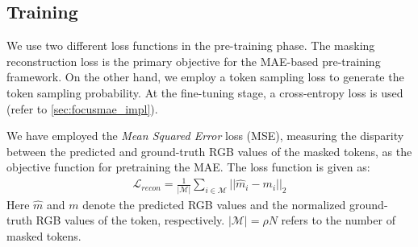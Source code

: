 \subsection{Training}
%
We use two different loss functions in the \focusmae pre-training phase. The masking reconstruction loss is the primary objective for the MAE-based pre-training framework. On the other hand, we employ a token sampling loss to generate the token sampling probability. At the fine-tuning stage, a cross-entropy loss is used (refer to \cref{sec:focusmae_impl}).

%
We have employed the \emph{Mean Squared Error} loss (MSE), measuring the disparity between the predicted and ground-truth RGB values of the masked tokens, as the objective function for pretraining the MAE. The loss function is given as:
\begin{align}
   \mathcal{L}_{recon} = \frac{1}{|\mathcal{M}|}\sum_{i \in \mathcal{M}}||\hat{m}_i - m_i||_2 
\end{align}
Here $\hat{m}$ and $m$ denote the predicted RGB values and the normalized ground-truth RGB values of the token, respectively. $|\mathcal{M}| = \rho N$ refers to the number of masked tokens. %

